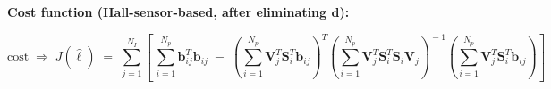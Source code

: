 \documentclass[12pt]{article}
\begin{document}
\thispagestyle{empty}

\noindent
\textbf{Cost function (Hall-sensor-based, after eliminating $\bm{d}$):}

\begin{equation*}
\mathrm{cost} \;\Rightarrow\; J(\hat{\ell}) \;=\;
\sum_{j=1}^{N_I}\left[\,
\sum_{i=1}^{N_p}\mathbf{b}_{ij}^{T}\mathbf{b}_{ij}
\;-\;
\left(\sum_{i=1}^{N_p}\mathbf{V}_{j}^{T}\mathbf{S}_{i}^{T}\mathbf{b}_{ij}\right)^{\!T}
\left(\sum_{i=1}^{N_p}\mathbf{V}_{j}^{T}\mathbf{S}_{i}^{T}\mathbf{S}_{i}\mathbf{V}_{j}\right)^{\!-1}
\left(\sum_{i=1}^{N_p}\mathbf{V}_{j}^{T}\mathbf{S}_{i}^{T}\mathbf{b}_{ij}\right)
\right]
\end{equation*}
\end{document}
